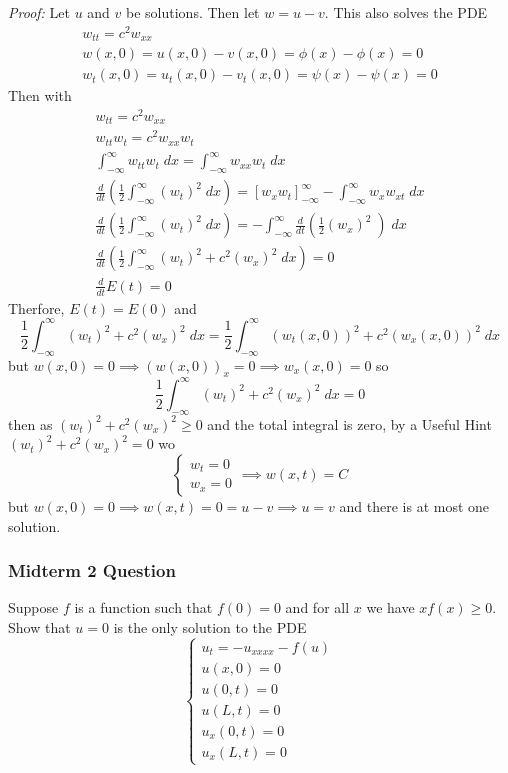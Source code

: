 \documentclass[10pt]{article}
\begin{document}
\emph{Proof:} Let $u$ and $v$ be solutions. Then let $w = u - v$. This also solves the PDE
\begin{gather*}
    w_{tt} = c^2 w_{xx}\\
    w(x, 0) = u(x, 0) - v(x, 0) = \phi(x) - \phi(x) = 0\\
    w_t(x, 0) = u_t(x, 0) - v_t(x,0) = \psi(x) - \psi(x) = 0
\end{gather*}
Then with 
\begin{gather*}
    w_{tt} = c^2 w_{xx}\\
    w_{tt}w_t = c^2 w_{xx}w_t\\
    \int_{-\infty}^{\infty} w_{tt}w_t\; dx = \int_{-\infty}^{\infty} w_{xx}w_t \; dx\\
    \frac{d}{dt}\left(\frac{1}{2}\int_{-\infty}^{\infty} (w_t)^2\; dx\right) = [w_xw_t]_{-\infty}^\infty - \int_{-\infty}^{\infty} w_x w_{xt}\; dx\\
    \frac{d}{dt}\left(\frac{1}{2}\int_{-\infty}^{\infty} (w_t)^2\; dx\right) = -\int_{-\infty}^{\infty} \frac{d}{dt}\left(\frac{1}{2}(w_x)^2\;\right)\; dx\\
    \frac{d}{dt}\left(\frac{1}{2}\int_{-\infty}^{\infty} (w_t)^2 + c^2(w_x)^2\; dx\right) = 0\\
    \frac{d}{dt}E(t) = 0
\end{gather*}
Therfore, $E(t) = E(0)$ and 
\[\frac{1}{2}\int_{-\infty}^{\infty} (w_t)^2 + c^2(w_x)^2\; dx = \frac{1}{2}\int_{-\infty}^{\infty} (w_t(x, 0))^2 + c^2(w_x(x, 0))^2\; dx\]
but $w(x, 0) = 0 \implies (w(x, 0))_x = 0 \implies w_x(x, 0) = 0$ so 
\[\frac{1}{2}\int_{-\infty}^{\infty} (w_t)^2 + c^2(w_x)^2\; dx = 0\]
then as $(w_t)^2 + c^2(w_x)^2 \geq 0$ and the total integral is zero, by a Useful Hint $(w_t)^2 + c^2(w_x)^2 = 0$ wo 
\[\begin{cases}
    w_t = 0\\
    w_x =0
\end{cases} \implies w(x, t) = C\]
but $w(x, 0) = 0 \implies w(x, t) = 0 = u - v \implies u = v$ and there is at most one solution. 

\subsubsection{Midterm 2 Question}
Suppose $f$ is a function such that $f(0)=0$ and for all $x$ we have $xf(x) \geq 0$. Show that $u=0$ is the only solution to the PDE 
\[\begin{cases}
    u_t = -u_{xxxx} - f(u)\\
    u(x, 0) = 0\\
    u(0, t) = 0\\
    u(L, t) = 0\\
    u_x(0, t) = 0\\
    u_x(L, t) = 0
\end{cases}\]
\end{document}
